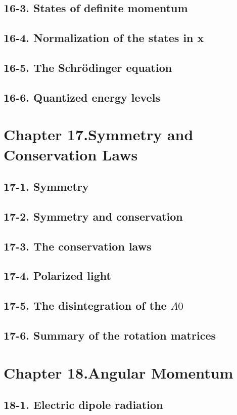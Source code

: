 \documentclass{article}
\begin{document}
\subsection{16-3. States of definite momentum}
\subsection{16-4. Normalization of the states in x}
\subsection{16-5. The Schrödinger equation}
\subsection{16-6. Quantized energy levels}
\section{Chapter 17.Symmetry and Conservation Laws}
\subsection{17-1. Symmetry}
\subsection{17-2. Symmetry and conservation}
\subsection{17-3. The conservation laws}
\subsection{17-4. Polarized light}
\subsection{17-5. The disintegration of the $Λ0$}
\subsection{17-6. Summary of the rotation matrices}
\section{Chapter 18.Angular Momentum}
\subsection{18-1. Electric dipole radiation}
\end{document}
